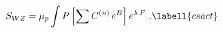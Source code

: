 \begin{equation}
S_{WZ}=\mu_p\int P\left[ \sum C^{(n)}\,e^B\right]e^{\lambda\,F}\ .
\labell{csact}
\end{equation}

